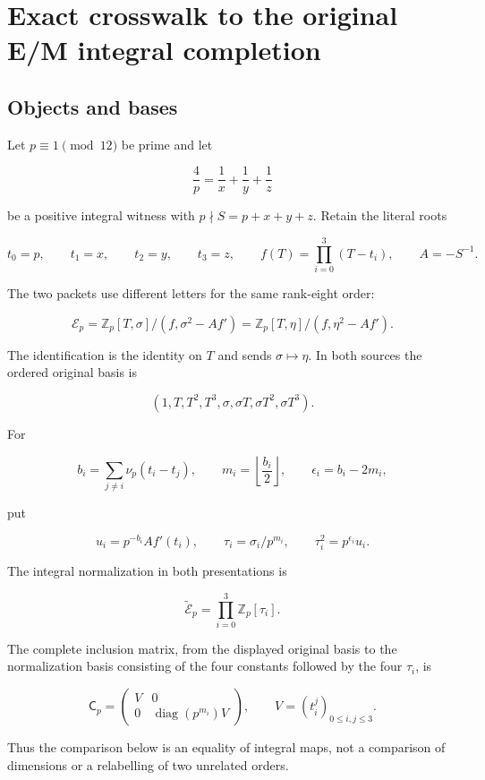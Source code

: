 \section{Exact crosswalk to the original E/M integral
completion}\label{exact-crosswalk-to-the-original-em-integral-completion}

\subsection{Objects and bases}\label{objects-and-bases}

Let \(p\equiv1\pmod {12}\) be prime and let

\[
\frac4p=\frac1x+\frac1y+\frac1z
\]

be a positive integral witness with \(p\nmid S=p+x+y+z\). Retain the
literal roots

\[
t_0=p,\qquad t_1=x,\qquad t_2=y,\qquad t_3=z,\qquad
f(T)=\prod_{i=0}^3(T-t_i),\qquad A=-S^{-1}.
\]

The two packets use different letters for the same rank-eight order:

\[
\mathscr E_p
=\mathbb Z_p[T,\sigma]/(f,\sigma^2-Af')
=\mathbb Z_p[T,\eta]/(f,\eta^2-Af').
\]

The identification is the identity on \(T\) and sends
\(\sigma\mapsto\eta\). In both sources the ordered original basis is

\[
(1,T,T^2,T^3,\sigma,\sigma T,\sigma T^2,\sigma T^3).
\]

For

\[
b_i=\sum_{j\ne i}\nu_p(t_i-t_j),\qquad
m_i=\left\lfloor\frac{b_i}{2}\right\rfloor,\qquad
\epsilon_i=b_i-2m_i,
\]

put

\[
u_i=p^{-b_i}Af'(t_i),\qquad
\tau_i=\sigma_i/p^{m_i},\qquad
\tau_i^2=p^{\epsilon_i}u_i.
\]

The integral normalization in both presentations is

\[
\widetilde{\mathscr E}_p=\prod_{i=0}^3\mathbb Z_p[\tau_i].
\]

The complete inclusion matrix, from the displayed original basis to the
normalization basis consisting of the four constants followed by the
four \(\tau_i\), is

\[
\mathsf C_p=
\begin{pmatrix}
V&0\\
0&\operatorname{diag}(p^{m_i})V
\end{pmatrix},\qquad
V=(t_i^j)_{0\le i,j\le3}.
\]

Thus the comparison below is an equality of integral maps, not a
comparison of dimensions or a relabelling of two unrelated orders.

